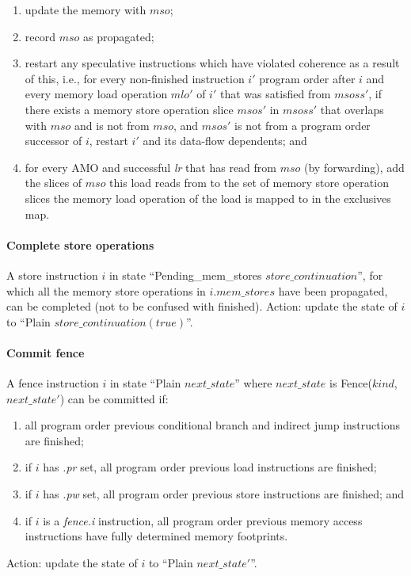 \begin{enumerate}
\item update the memory with $mso$;
\item record $mso$ as propagated;
\item restart any speculative instructions which have violated coherence as a result of this, i.e., for every non-finished instruction $i'$ program order after $i$ and every memory load operation $mlo'$ of $i'$ that was satisfied from $msoss'$, if there exists a memory store operation slice $msos'$ in $msoss'$ that overlaps with $mso$ and is not from $mso$, and $msos'$ is not from a program order successor of $i$, restart $i'$ and its data-flow dependents; and
\item for every AMO and successful {\em lr} that has read from $mso$ (by forwarding), add the slices of $mso$ this load reads from to the set of memory store operation slices the memory load operation of the load is mapped to in the exclusives map.
\end{enumerate}

\paragraph{Complete store operations}\label{omm:complete_stores}
A store instruction $i$ in state ``{\sc Pending\_mem\_stores} $store\_continuation$'', for which all the memory store operations in $i.mem\_stores$ have been propagated, can be completed (not to be confused with finished).
Action: update the state of $i$ to ``{\sc Plain} $store\_continuation(true)$''.


\paragraph{Commit fence}\label{omm:commit_barrier}
A fence instruction $i$ in state ``{\sc Plain} $next\_state$'' where $next\_state$ is {\sc Fence}($kind$, $next\_state'$) can be committed if:
\begin{enumerate}
\item all program order previous conditional branch and indirect jump instructions are finished;
\item if $i$ has {\em .pr} set, all program order previous load instructions are finished;
\item if $i$ has {\em .pw} set, all program order previous store instructions are finished; and
\item if $i$ is a {\em fence.i} instruction, all program order previous memory access instructions have fully determined memory footprints. 
\end{enumerate}
Action: update the state of $i$ to ``{\sc Plain} $next\_state'$''.


